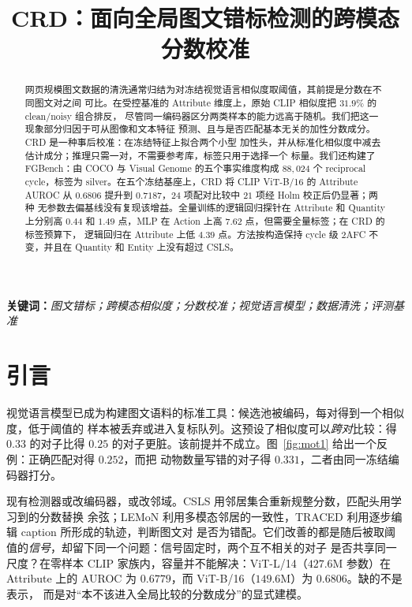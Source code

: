 \documentclass[10pt,twocolumn,a4paper]{ctexart}
\title{\bfseries CRD：面向全局图文错标检测的跨模态分数校准}
\author{}
\date{}
\begin{document}
\maketitle

\begin{abstract}
\noindent
网页规模图文数据的清洗通常归结为对冻结视觉语言相似度取阈值，其前提是分数在不同图文对之间
可比。在受控基准的 Attribute 维度上，原始 CLIP 相似度把 $31.9\%$ 的 clean/noisy 组合排反，
尽管同一编码器区分两类样本的能力远高于随机。我们把这一现象部分归因于可从图像和文本特征
预测、且与是否匹配基本无关的加性分数成分。CRD 是一种事后校准：在冻结特征上拟合两个小型
加性头，并从标准化相似度中减去估计成分；推理只需一对，不需要参考库，标签只用于选择一个
标量。我们还构建了 FGBench：由 COCO 与 Visual Genome 的五个事实维度构成 $88{,}024$ 个
reciprocal cycle，标签为 silver。在五个冻结基座上，CRD 将 CLIP ViT-B/16 的 Attribute
AUROC 从 $0.6806$ 提升到 $0.7187$，$24$ 项配对比较中 $21$ 项经 Holm 校正后仍显著；两种
无参数去偏基线没有复现该增益。全量训练的逻辑回归探针在 Attribute 和 Quantity 上分别高
$0.44$ 和 $1.49$ 点，MLP 在 Action 上高 $7.62$ 点，但需要全量标签；在 CRD 的标签预算下，
逻辑回归在 Attribute 上低 $4.39$ 点。方法按构造保持 cycle 级 2AFC 不变，并且在 Quantity
和 Entity 上没有超过 CSLS。
\end{abstract}

\noindent\textbf{关键词：}\emph{图文错标；跨模态相似度；分数校准；视觉语言模型；数据清洗；评测基准}

\section{引言}
\label{sec:intro-cn}

视觉语言模型已成为构建图文语料的标准工具：候选池被编码，每对得到一个相似度，低于阈值的
样本被丢弃或进入复标队列。这预设了相似度可以\emph{跨对}比较：得 $0.33$ 的对子比得 $0.25$
的对子更脏。该前提并不成立。图~\ref{fig:mot1} 给出一个反例：正确匹配对得 $0.252$，而把
动物数量写错的对子得 $0.331$，二者由同一冻结编码器打分。

现有检测器或改编码器，或改邻域。CSLS 用邻居集合重新规整分数，匹配头用学习到的分数替换
余弦；LEMoN 利用多模态邻居的一致性，TRACED 利用逐步编辑 caption 所形成的轨迹，判断图文对
是否为错配。它们改善的都是随后被取阈值的\emph{信号}，却留下同一个问题：信号固定时，两个互不相关的对子
是否共享同一尺度？在零样本 CLIP 家族内，容量并不能解决：ViT-L/14（$427.6$M 参数）在
Attribute 上的 AUROC 为 $0.6779$，而 ViT-B/16（$149.6$M）为 $0.6806$。缺的不是表示，
而是对“本不该进入全局比较的分数成分”的显式建模。
\end{document}
